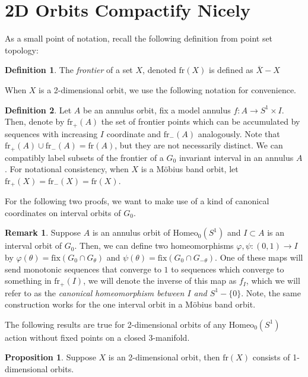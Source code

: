 \documentclass[10pt, oneside]{article}
\newcommand{\homeoS}{\text{Homeo}_0(S^1)}
\newcommand{\cl}[1]{\overline{#1}}
\theoremstyle{definition}
\newtheorem{defn}{Definition}
\newtheorem{rem}{Remark}
\newtheorem{prop}{Proposition}
\theoremstyle{definition}
\begin{document}
\section{2D Orbits Compactify Nicely}
As a small point of notation, recall the following definition from point set topology:
\begin{defn}
    The {\it frontier} of a set $X$, denoted $\text{fr}(X)$ is defined as $\cl{X}-X$
\end{defn}

When $X$ is a 2-dimensional orbit, we use the following notation for convenience.

\begin{defn}
    Let $A$ be an annulus orbit, fix a model annulus $f:A\to S^1\times I$. Then, denote by $\text{fr}_+(A)$ the set of frontier points which can be accumulated by sequences with increasing $I$ coordinate and $\text{fr}_-(A)$ analogously. Note that $\text{fr}_+(A)\cup\text{fr}_-(A) = \text{fr}(A)$, but they are not necessarily distinct. We can compatibly label subsets of the frontier of a $G_0$ invariant interval in an annulus $A$. For notational consistency, when $X$ is a M\"{o}bius band orbit, let $\text{fr}_+(X) = \text{fr}_-(X) = \text{fr}(X)$.
\end{defn}

For the following two proofs, we want to make use of a kind of canonical coordinates on interval orbits of $G_0$.

\begin{rem}\cite{mann-chen}
    Suppose $A$ is an annulus orbit of $\homeoS$ and $I\subset A$ is an interval orbit of $G_0$. Then, we can define two homeomorphisms $\varphi, \psi:(0,1) \to I$ by $\varphi(\theta) = \text{fix}(G_0\cap G_\theta)$ and $\psi(\theta) = \text{fix}(G_0\cap G_{-\theta})$. One of these maps will send monotonic sequences that converge to $1$ to sequences which converge to something in $\text{fr}_+(I)$, we will denote the inverse of this map as $f_I$, which we will refer to as the {\it canonical homeomorphism between $I$ and $S^1 - \{0\}$}. Note, the same construction works for the one interval orbit in a M\"{o}bius band orbit.
\end{rem}

The following results are true for 2-dimensional orbits of any $\homeoS$ action without fixed points on a closed 3-manifold.

\begin{prop}
    Suppose $X$ is an 2-dimensional orbit, then $\text{fr}(X)$ consists of 1-dimensional orbits.
\end{prop}
\end{document}
